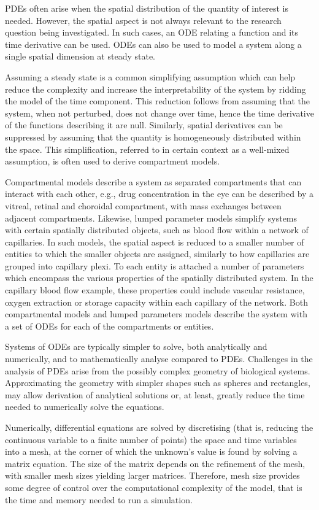 \documentclass{article}
\begin{document}
PDEs often arise when the spatial distribution of the quantity of interest is needed.
However, the spatial aspect is not always relevant to the research question being investigated.
In such cases, an ODE relating a function and its time derivative can be used.
ODEs can also be used to model a system along a single spatial dimension at steady state.

Assuming a steady state is a common simplifying assumption which can help reduce the complexity and increase the interpretability of the system by ridding the model of the time component.
This reduction follows from assuming that the system, when not perturbed, does not change over time, hence the time derivative of the functions describing it are null.
Similarly, spatial derivatives can be suppressed by assuming that the quantity is homogeneously distributed within the space.
This simplification, referred to in certain context as a well-mixed assumption, is often used to derive compartment models.

Compartmental models describe a system as separated compartments that can interact with each other, e.g., drug concentration in the eye can be described by a vitreal, retinal and choroidal compartment, with mass exchanges between adjacent compartments.
Likewise, lumped parameter models simplify systems with certain spatially distributed objects, such as blood flow within a network of capillaries.
In such models, the spatial aspect is reduced to a smaller number of entities to which the smaller objects are assigned, similarly to how capillaries are grouped into capillary plexi.
To each entity is attached a number of parameters which encompass the various properties of the spatially distributed system.
In the capillary blood flow example, these properties could include vascular resistance, oxygen extraction or storage capacity within each capillary of the network.
Both compartmental models and lumped parameters models describe the system with a set of ODEs for each of the compartments or entities.

Systems of ODEs are typically simpler to solve, both analytically and numerically, and to mathematically analyse compared to PDEs.
Challenges in the analysis of PDEs arise from the possibly complex geometry of biological systems.
Approximating the geometry with simpler shapes such as spheres and rectangles, may allow derivation of analytical solutions or, at least, greatly reduce the time needed to numerically solve the equations.

Numerically, differential equations are solved by discretising (that is, reducing the continuous variable to a finite number of points) the space and time variables into a mesh, at the corner of which the unknown's value is found by solving a matrix equation.
The size of the matrix depends on the refinement of the mesh, with smaller mesh sizes yielding larger matrices.
Therefore, mesh size provides some degree of control over the computational complexity of the model, that is the time and memory needed to run a simulation.
\end{document}
